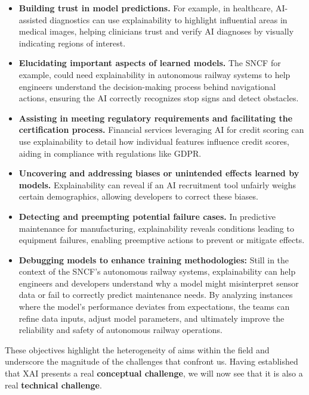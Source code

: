 \begin{itemize}
    \item \textbf{Building trust in model predictions.} For example, in healthcare, AI-assisted diagnostics can use explainability to highlight influential areas in medical images, helping clinicians trust and verify AI diagnoses by visually indicating regions of interest.
    
    \item \textbf{Elucidating important aspects of learned models.} The SNCF for example, could need explainability in autonomous railway systems to help engineers understand the decision-making process behind navigational actions, ensuring the AI correctly recognizes stop signs and detect obstacles.
    
    \item \textbf{Assisting in meeting regulatory requirements and facilitating the certification process.} Financial services leveraging AI for credit scoring can use explainability to detail how individual features influence credit scores, aiding in compliance with regulations like GDPR.
    
    \item \textbf{Uncovering and addressing biases or unintended effects learned by models.} Explainability can reveal if an AI recruitment tool unfairly weighs certain demographics, allowing developers to correct these biases.
    
    \item \textbf{Detecting and preempting potential failure cases.} In predictive maintenance for manufacturing, explainability reveals conditions leading to equipment failures, enabling preemptive actions to prevent or mitigate effects.
    
    \item \textbf{Debugging models to enhance training methodologies:} Still in the context of the SNCF's autonomous railway systems, explainability can help engineers and developers understand why a model might misinterpret sensor data or fail to correctly predict maintenance needs. By analyzing instances where the model's performance deviates from expectations, the teams can refine data inputs, adjust model parameters, and ultimately improve the reliability and safety of autonomous railway operations.
    
\end{itemize}

These objectives highlight the heterogeneity of aims within the field and underscore the magnitude of the challenges that confront us. Having established that XAI presents a real \textbf{conceptual challenge}, we will now see that it is also a real \textbf{technical challenge}.


